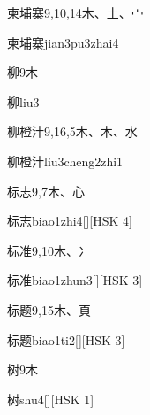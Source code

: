\begin{entry}{柬埔寨}{9,10,14}{⽊、⼟、⼧}
  \begin{phonetics}{柬埔寨}{jian3pu3zhai4}
  \end{phonetics}
\end{entry}

\begin{entry}{柳}{9}{⽊}
  \begin{phonetics}{柳}{liu3}
  \end{phonetics}
\end{entry}

\begin{entry}{柳橙汁}{9,16,5}{⽊、⽊、⽔}
  \begin{phonetics}{柳橙汁}{liu3cheng2zhi1}
  \end{phonetics}
\end{entry}

\begin{entry}{标志}{9,7}{⽊、⼼}
  \begin{phonetics}{标志}{biao1zhi4}[][HSK 4]
  \end{phonetics}
\end{entry}

\begin{entry}{标准}{9,10}{⽊、⼎}
  \begin{phonetics}{标准}{biao1zhun3}[][HSK 3]
  \end{phonetics}
\end{entry}

\begin{entry}{标题}{9,15}{⽊、⾴}
  \begin{phonetics}{标题}{biao1ti2}[][HSK 3]
  \end{phonetics}
\end{entry}

\begin{entry}{树}{9}{⽊}
  \begin{phonetics}{树}{shu4}[][HSK 1]
  \end{phonetics}
\end{entry}

